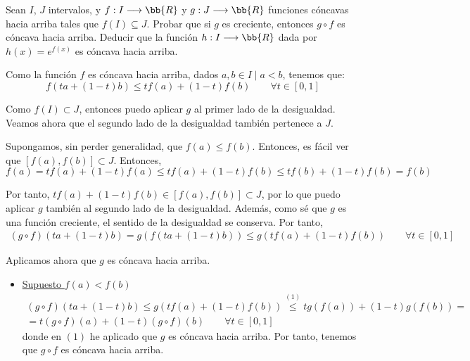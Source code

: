\begin{ejercicio}
    Sean $I$, $J$ intervalos, y $f:I\longrightarrow \bb{R}$ y $g:J\longrightarrow \bb{R}$ funciones cóncavas hacia arriba tales que $f(I)\subseteq J$. Probar que si $g$ es creciente, entonces $g\circ f$ es cóncava hacia arriba. Deducir que la función $h:I\longrightarrow \bb{R}$ dada por $h(x)=e^{f(x)}$ es cóncava hacia arriba.

    Como la función $f$ es cóncava hacia arriba, dados $a,b\in I\mid a<b$, tenemos que:
    \begin{equation*}
        f(ta + (1-t)b) \leq tf(a) +(1-t)f(b) \qquad \forall t\in [0,1]
    \end{equation*}

    Como $f(I)\subset J$, entonces puedo aplicar $g$ al primer lado de la desigualdad. Veamos ahora que el segundo lado de la desigualdad también pertenece a $J$.

    Supongamos, sin perder generalidad, que $f(a)\leq f(b)$. Entonces, es fácil ver que $[f(a),f(b)] \subset J$. Entonces,
    \begin{equation*}
        f(a)
        = tf(a) +(1-t)f(a)
        \leq tf(a) +(1-t)f(b)
        \leq tf(b) +(1-t)f(b)
        = f(b)
    \end{equation*}

    Por tanto, $tf(a) +(1-t)f(b) \in [f(a),f(b)] \subset J$, por lo que puedo aplicar $g$ también al segundo lado de la desigualdad. Además, como sé que $g$ es una función creciente, el sentido de la desigualdad se conserva. Por tanto,
    \begin{multline*}
        (g\circ f)(ta + (1-t)b) = g(f(ta + (1-t)b))
        \leq g(tf(a) +(1-t)f(b))
        \qquad \forall t\in [0,1]
    \end{multline*}

    Aplicamos ahora que $g$ es cóncava hacia arriba.
    \begin{itemize}
        \item \underline{Supuesto $f(a)<f(b)$}
        \begin{multline*}
            (g\circ f)(ta + (1-t)b) 
            \leq g(tf(a) +(1-t)f(b))
            \stackrel{(1)}{\leq}
            tg(f(a)) +(1-t)g(f(b)) =\\= t(g\circ f)(a)+(1-t)(g\circ f)(b)
            \qquad \forall t\in [0,1]
        \end{multline*}
        donde en $(1)$ he aplicado que $g$ es cóncava hacia arriba. Por tanto, tenemos que $g\circ f$ es cóncava hacia arriba.


\end{itemize}
\end{ejercicio}
